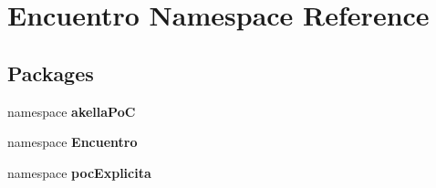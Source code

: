 \section{\-Encuentro \-Namespace \-Reference}
\label{namespace_encuentro}
\subsection*{\-Packages}
\begin{DoxyCompactItemize}
\item 
namespace {\bf akella\-Po\-C}
\item 
namespace {\bf \-Encuentro}
\item 
namespace {\bf poc\-Explicita}
\end{DoxyCompactItemize}
